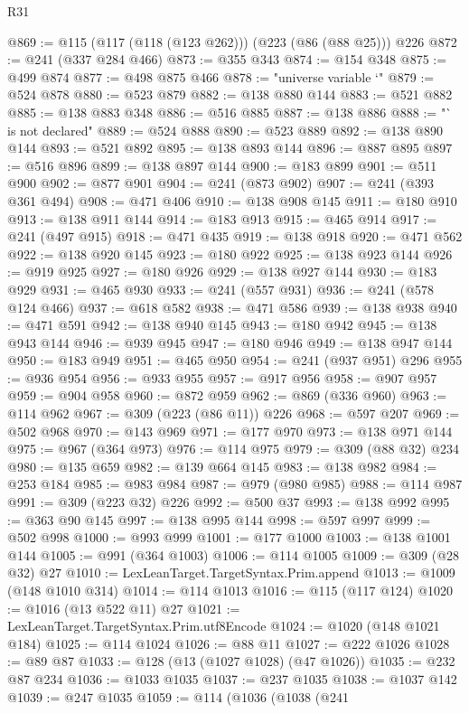 \begin{lexlean}{R31}
\begin{coremodule}
@869 := @115 (@117 (@118 (@123 @262))) (@223 (@86 (@88 @25))) @226
@872 := @241 (@337 @284 @466)
@873 := @355 @343
@874 := @154 @348
@875 := @499 @874
@877 := @498 @875 @466
@878 := "universe variable `"
@879 := @524 @878
@880 := @523 @879
@882 := @138 @880 @144
@883 := @521 @882
@885 := @138 @883 @348
@886 := @516 @885
@887 := @138 @886
@888 := "` is not declared"
@889 := @524 @888
@890 := @523 @889
@892 := @138 @890 @144
@893 := @521 @892
@895 := @138 @893 @144
@896 := @887 @895
@897 := @516 @896
@899 := @138 @897 @144
@900 := @183 @899
@901 := @511 @900
@902 := @877 @901
@904 := @241 (@873 @902)
@907 := @241 (@393 @361 @494)
@908 := @471 @406
@910 := @138 @908 @145
@911 := @180 @910
@913 := @138 @911 @144
@914 := @183 @913
@915 := @465 @914
@917 := @241 (@497 @915)
@918 := @471 @435
@919 := @138 @918
@920 := @471 @562
@922 := @138 @920 @145
@923 := @180 @922
@925 := @138 @923 @144
@926 := @919 @925
@927 := @180 @926
@929 := @138 @927 @144
@930 := @183 @929
@931 := @465 @930
@933 := @241 (@557 @931)
@936 := @241 (@578 @124 @466)
@937 := @618 @582
@938 := @471 @586
@939 := @138 @938
@940 := @471 @591
@942 := @138 @940 @145
@943 := @180 @942
@945 := @138 @943 @144
@946 := @939 @945
@947 := @180 @946
@949 := @138 @947 @144
@950 := @183 @949
@951 := @465 @950
@954 := @241 (@937 @951) @296
@955 := @936 @954
@956 := @933 @955
@957 := @917 @956
@958 := @907 @957
@959 := @904 @958
@960 := @872 @959
@962 := @869 (@336 @960)
@963 := @114 @962
@967 := @309 (@223 (@86 @11)) @226
@968 := @597 @207
@969 := @502 @968
@970 := @143 @969
@971 := @177 @970
@973 := @138 @971 @144
@975 := @967 (@364 @973)
@976 := @114 @975
@979 := @309 (@88 @32) @234
@980 := @135 @659
@982 := @139 @664 @145
@983 := @138 @982
@984 := @253 @184
@985 := @983 @984
@987 := @979 (@980 @985)
@988 := @114 @987
@991 := @309 (@223 @32) @226
@992 := @500 @37
@993 := @138 @992
@995 := @363 @90 @145
@997 := @138 @995 @144
@998 := @597 @997
@999 := @502 @998
@1000 := @993 @999
@1001 := @177 @1000
@1003 := @138 @1001 @144
@1005 := @991 (@364 @1003)
@1006 := @114 @1005
@1009 := @309 (@28 @32) @27
@1010 := LexLeanTarget.TargetSyntax.Prim.append
@1013 := @1009 (@148 @1010 @314)
@1014 := @114 @1013
@1016 := @115 (@117 @124)
@1020 := @1016 (@13 @522 @11) @27
@1021 := LexLeanTarget.TargetSyntax.Prim.utf8Encode
@1024 := @1020 (@148 @1021 @184)
@1025 := @114 @1024
@1026 := @88 @11
@1027 := @222 @1026
@1028 := @89 @87
@1033 := @128 (@13 (@1027 @1028) (@47 @1026))
@1035 := @232 @87 @234
@1036 := @1033 @1035
@1037 := @237 @1035
@1038 := @1037 @142
@1039 := @247 @1035
@1059 := @114
    (@1036
      (@1038
        (@241

\end{coremodule}
\end{lexlean}
